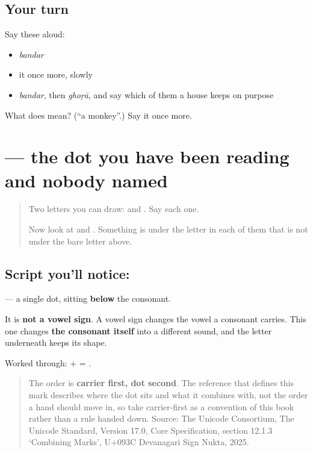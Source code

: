 \subsection*{Your turn}
Say these aloud:

\begin{itemize}
\raggedright
  \item \emph{bandar}
  \item it once more, slowly
  \item \emph{bandar}, then \emph{ghoṛā}, and say which of them a house keeps on purpose
\end{itemize}

\begin{tcolorbox}[breakable,colback=teal!4,colframe=teal!35!black,title={Before you move on}]
What does  mean? (\textquotedblleft{}a monkey\textquotedblright{}.) Say it once more.
\end{tcolorbox}
\section[\texorpdfstring{\hi{़} (nuqtā)}{़ (nuqtā)}]{ — the dot you have been reading and nobody named}

\label{lesson:HI-S140-nuqta}



\begin{quote}
Two letters you can draw: \textbf{} and \textbf{}. Say each one.

Now look at \textbf{} and \textbf{}. Something is under the letter in each of them that is not under the bare letter above.
\end{quote}

\subsection*{Script you'll notice: }
\textbf{} — a single dot, sitting \textbf{below} the consonant.

It is \textbf{not a vowel sign}. A vowel sign changes the vowel a consonant carries. This one changes \textbf{the consonant itself} into a different sound, and the letter underneath keeps its shape.

Worked through: \textbf{} + \textbf{} = \textbf{}.

\begin{quote}
The order is \textbf{carrier first, dot second}. The reference that defines this mark describes where the dot sits and what it combines with, not the order a hand should move in, so take carrier-first as a convention of this book rather than a rule handed down. Source: The Unicode Consortium, The Unicode Standard, Version 17.0, Core Specification, section 12.1.3 ‘Combining Marks’, U+093C Devanagari Sign Nukta, 2025.
\end{quote}

